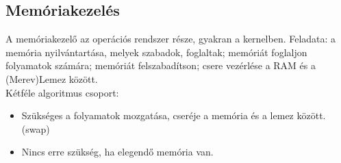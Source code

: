 \documentclass[margin=0px]{article}
\begin{document}
\subsection{Memóriakezelés}

A memóriakezelő az operációs rendszer része, gyakran a kernelben. Feladata: a memória nyilvántartása, melyek szabadok, foglaltak; memóriát foglaljon folyamatok számára; memóriát felszabadítson; csere vezérlése a RAM és a (Merev)Lemez között. \\
Kétféle algoritmus csoport:
\begin{itemize}
    \item Szükséges a folyamatok mozgatása, cseréje a memória és a lemez között. (swap)
    \item Nincs erre szükség, ha elegendő memória van.
\end{itemize}
\end{document}
